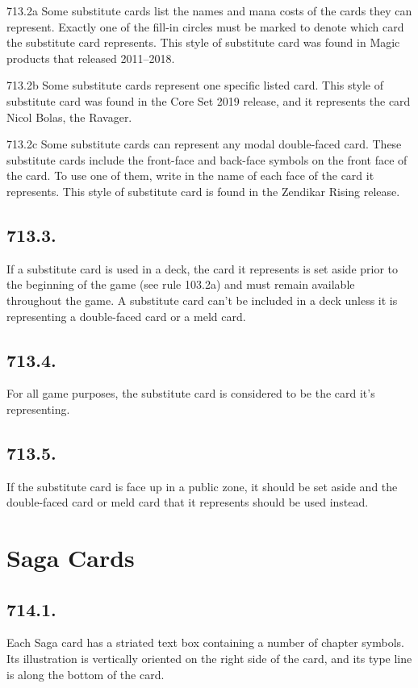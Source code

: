 713.2a Some substitute cards list the names and mana costs of the cards they can represent. Exactly one of the fill-in circles must be marked to denote which card the substitute card represents. This style of substitute card was found in Magic products that released 2011–2018.

713.2b Some substitute cards represent one specific listed card. This style of substitute card was found in the Core Set 2019 release, and it represents the card Nicol Bolas, the Ravager.

713.2c Some substitute cards can represent any modal double-faced card. These substitute cards include the front-face and back-face symbols on the front face of the card. To use one of them, write in the name of each face of the card it represents. This style of substitute card is found in the Zendikar Rising release.

\subsection*{713.3.}
If a substitute card is used in a deck, the card it represents is set aside prior to the beginning of the game (see rule 103.2a) and must remain available throughout the game. A substitute card can’t be included in a deck unless it is representing a double-faced card or a meld card.

\subsection*{713.4.}
For all game purposes, the substitute card is considered to be the card it’s representing.

\subsection*{713.5.}
If the substitute card is face up in a public zone, it should be set aside and the double-faced card or meld card that it represents should be used instead.

\section{Saga Cards}
\subsection*{714.1.}
Each Saga card has a striated text box containing a number of chapter symbols. Its illustration is vertically oriented on the right side of the card, and its type line is along the bottom of the card.

